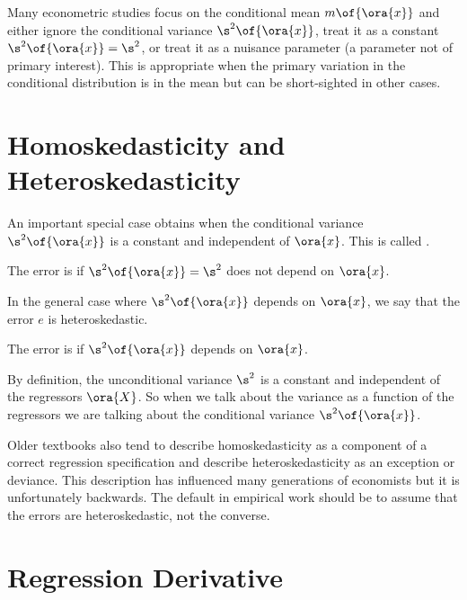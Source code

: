 Many econometric studies focus on the conditional mean $m\of{\ora{x}}$ and either ignore the conditional variance $\s^2\of{\ora{x}}$, treat it as a constant $\s^2\of{\ora{x}} = \s^2$, or treat it as a nuisance parameter (a parameter not of primary interest). This is appropriate when the primary variation in the conditional distribution is in the mean but can be short-sighted in other cases. 

\section{Homoskedasticity and Heteroskedasticity}

An important special case obtains when the conditional variance $\s^2\of{\ora{x}}$ is a constant and independent of $\ora{x}$. This is called .
\begin{definition}
    The error is  if $\s^2\of{\ora{x}} = \s^2$ does not depend on $\ora{x}$.
\end{definition}
In the general case where $\s^2\of{\ora{x}}$ depends on $\ora{x}$, we say that the error $e$ is heteroskedastic.
\begin{definition}
    The error is  if $\s^2\of{\ora{x}}$ depends on $\ora{x}$.
\end{definition}

 By definition, the unconditional variance $\s^2$ is a constant and independent of the regressors $\ora{X}$. So when we talk about the variance as a function of the regressors we are talking about the conditional variance $\s^2\of{\ora{x}}$.

Older textbooks also tend to describe homoskedasticity as a component of a correct regression specification and describe heteroskedasticity as an exception or deviance. This description has influenced many generations of economists but it is unfortunately backwards.  The default in empirical work should be to assume that the errors are heteroskedastic, not the converse.


\section{Regression Derivative}

